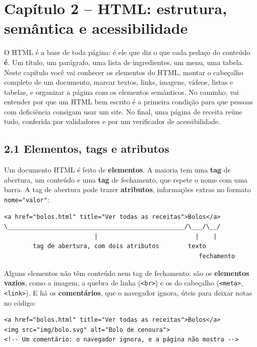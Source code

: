 \section{Capítulo 2 -- HTML: estrutura, semântica e acessibilidade}

O HTML é a base de toda página: é ele que diz o que cada pedaço do conteúdo \textbf{é}. Um título, um parágrafo, uma lista de ingredientes, um menu, uma tabela. Neste capítulo você vai conhecer os elementos do HTML, montar o cabeçalho completo de um documento, marcar textos, links, imagens, vídeos, listas e tabelas, e organizar a página com os elementos semânticos. No caminho, vai entender por que um HTML bem escrito é a primeira condição para que pessoas com deficiência consigam usar um site. No final, uma página de receita reúne tudo, conferida por validadores e por um verificador de acessibilidade.

\subsection{2.1 Elementos, tags e atributos}

Um documento HTML é feito de \textbf{elementos}. A maioria tem uma \textbf{tag} de abertura, um conteúdo e uma \textbf{tag} de fechamento, que repete o nome com uma barra. A tag de abertura pode trazer \textbf{atributos}, informações extras no formato \texttt{nome="valor"}:

\begin{codigo}
\begin{Verbatim}[breaklines=true, breaksymbolleft={}, fontsize=\footnotesize]
<a href="bolos.html" title="Ver todas as receitas">Bolos</a>
\_________________________________________________/\___/\__/
                         |                           |    |
        tag de abertura, com dois atributos        texto
                                                      fechamento
\end{Verbatim}
\end{codigo}

Alguns elementos não têm conteúdo nem tag de fechamento: são os \textbf{elementos vazios}, como a imagem, a quebra de linha (\texttt{<br>}) e os do cabeçalho (\texttt{<meta>}, \texttt{<link>}). E há os \textbf{comentários}, que o navegador ignora, úteis para deixar notas no código:

\begin{codigo}
\begin{Verbatim}[breaklines=true, breaksymbolleft={}, fontsize=\footnotesize]
<a href="bolos.html" title="Ver todas as receitas">Bolos</a>
<img src="img/bolo.svg" alt="Bolo de cenoura">
<!-- Um comentário: o navegador ignora, e a página não mostra -->
\end{Verbatim}
\end{codigo}

